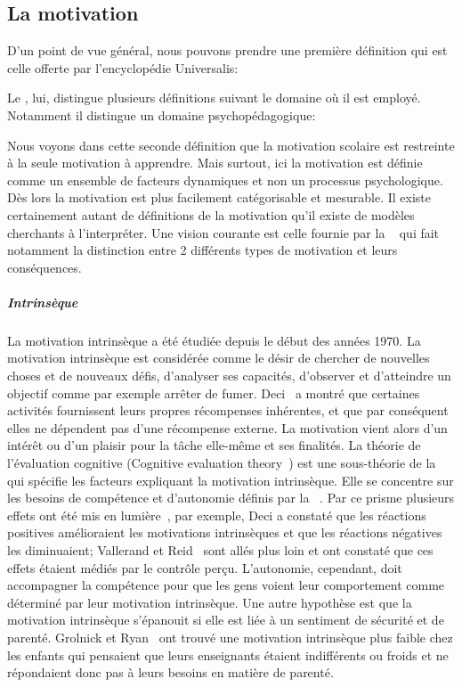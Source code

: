     \subsection{La motivation}
                D'un point de vue général, nous pouvons prendre une première définition qui est celle offerte par l'encyclopédie Universalis:
                \par%
                Le , lui, distingue plusieurs définitions suivant le domaine où il est employé. Notamment il distingue un domaine psychopédagogique:
                \par%
                Nous voyons dans cette seconde définition que la motivation scolaire est restreinte à la seule motivation à apprendre. Mais surtout, ici la motivation est définie comme un ensemble de facteurs dynamiques et non un processus psychologique. Dès lors la motivation est plus facilement catégorisable et mesurable. 
                Il existe certainement autant de définitions de la motivation qu'il existe de modèles cherchants à l'interpréter.
                Une vision courante est celle fournie par la ~ qui fait notamment la distinction entre 2 différents types de motivation et leurs conséquences.
            \subparagraph{Intrinsèque}
                La motivation intrinsèque a été étudiée depuis le début des années 1970. La motivation intrinsèque est considérée comme le désir de chercher de nouvelles choses et de nouveaux défis, d’analyser ses capacités, d’observer et d’atteindre un objectif comme par exemple arrêter de fumer. Deci~ a montré que certaines activités fournissent leurs propres récompenses inhérentes, et que par conséquent elles ne dépendent pas d'une récompense externe. La motivation vient alors d'un intérêt ou d'un plaisir pour la tâche elle-même et ses finalités. 
                La théorie de l'évaluation cognitive (Cognitive evaluation theory~) est une sous-théorie de la  qui spécifie les facteurs expliquant la motivation intrinsèque. Elle se concentre sur les besoins de compétence et d’autonomie définis par la ~. Par ce prisme plusieurs effets ont été mis en lumière~, par exemple, Deci a constaté que les réactions positives amélioraient les motivations intrinsèques et que les réactions négatives les diminuaient; Vallerand et Reid~ sont allés plus loin et ont constaté que ces effets étaient médiés par le contrôle perçu. L'autonomie, cependant, doit accompagner la compétence pour que les gens voient leur comportement comme déterminé par leur motivation intrinsèque. Une autre hypothèse est que la motivation intrinsèque s'épanouit si elle est liée à un sentiment de sécurité et de parenté. Grolnick et Ryan~ ont trouvé une motivation intrinsèque plus faible chez les enfants qui pensaient que leurs enseignants étaient indifférents ou froids et ne répondaient donc pas à leurs besoins en matière de parenté.
